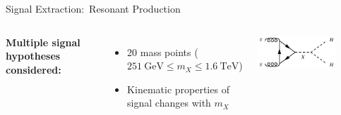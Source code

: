 \documentclass[11pt, xcolor={dvipsnames}, aspectratio=169, notes]{beamer}
\begin{document}

\begin{frame}{Signal Extraction:\ Resonant \allbold{\HH} Production}
  \begin{columns}[onlytextwidth]

    \vspace*{0.2em}

    \textbf{Multiple signal hypotheses considered:}
    \begin{itemize}
    \item 20 mass points ($\SI{251}{\GeV} \leq m_{X} \leq \SI{1.6}{\TeV}$)
    \item Kinematic properties of signal changes with $m_{X}$
    \end{itemize}



    \vspace*{1.5em}



    \vspace*{1em}


    \centering

    \hspace*{3em}\includegraphics[width=0.75\textwidth]{feynman_graphs/di_higgs_resonant}

    \vspace{1em}


\end{columns}
\end{frame}
\end{document}
